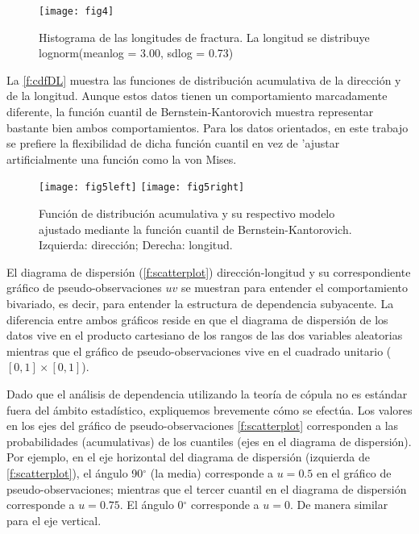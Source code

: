\begin{figure}
	\centering
	\texttt{[image: fig4]}
	\caption{Histograma de las longitudes de fractura. La longitud se distribuye lognorm(meanlog = 3.00, sdlog = 0.73)}
	\label{f:hist}
\end{figure}



La \autoref{f:cdfDL} muestra las funciones de distribuci\'on acumulativa de la direcci\'on y de la longitud. Aunque estos datos tienen un comportamiento marcadamente diferente, la funci\'on cuantil de Bernstein-Kantorovich muestra representar bastante bien ambos comportamientos. Para los datos orientados, en este trabajo se prefiere la flexibilidad de dicha funci\'on cuantil en vez de 'ajustar artificialmente una funci\'on como la von Mises.

\begin{figure}
	\centering
	\texttt{[image: fig5left]}
	\qquad
	\texttt{[image: fig5right]}
	\caption{Funci\'on de distribuci\'on acumulativa y su respectivo modelo ajustado mediante la funci\'on cuantil de Bernstein-Kantorovich. Izquierda: direcci\'on; Derecha: longitud.}
	\label{f:cdfDL}
\end{figure}

El diagrama de dispersi\'on (\autoref{f:scatterplot}) direcci\'on-longitud y su correspondiente gr\'afico de pseudo-observaciones $uv$ se muestran para entender el comportamiento bivariado, es decir, para entender la estructura de dependencia subyacente. La diferencia entre ambos gr\'aficos reside en que el diagrama de dispersi\'on de los datos vive en el producto cartesiano de los rangos de las dos variables aleatorias mientras que el gr\'afico de pseudo-observaciones vive en el cuadrado unitario ($[0, 1] \times [0, 1]$).

Dado que el an\'alisis de dependencia utilizando la teor\'ia de c\'opula no es est\'andar fuera del \'ambito estad\'istico, expliquemos brevemente c\'omo se efect\'ua. Los valores en los ejes del gr\'afico de pseudo-observaciones \autoref{f:scatterplot} corresponden a las probabilidades (acumulativas) de los cuantiles (ejes en el diagrama de dispersi\'on). Por ejemplo, en el eje horizontal del diagrama de dispersi\'on (izquierda de \autoref{f:scatterplot}), el \'angulo 90$^\circ$ (la media) corresponde a $u = 0.5$ en el gr\'afico de pseudo-observaciones; mientras que el tercer cuantil en el diagrama de dispersi\'on corresponde a $u = 0.75$. El \'angulo 0$^\circ$ corresponde a $u=0$. De manera similar para el eje vertical.

